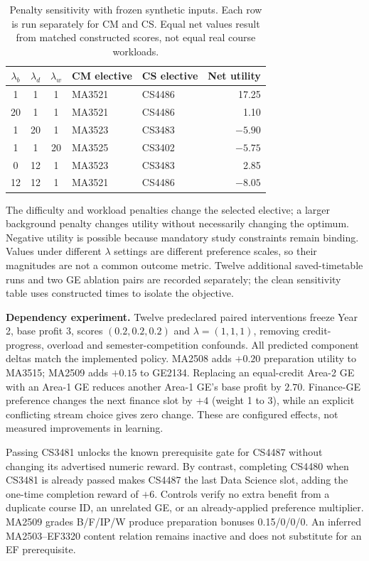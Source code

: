 \documentclass{article}
\begin{document}
\begin{table}[H]
\centering\small
\caption{Penalty sensitivity with frozen synthetic inputs. Each row is run separately for CM and CS. Equal net values result from matched constructed scores, not equal real course workloads.}
\begin{tabular}{cccp{1.05in}p{1.05in}r}
\toprule
$\lambda_b$ & $\lambda_d$ & $\lambda_w$ & CM elective & CS elective & Net utility\\
\midrule
1 & 1 & 1 & MA3521 & CS4486 & 17.25\\
20 & 1 & 1 & MA3521 & CS4486 & 1.10\\
1 & 20 & 1 & MA3523 & CS3483 & $-5.90$\\
1 & 1 & 20 & MA3525 & CS3402 & $-5.75$\\
0 & 12 & 1 & MA3523 & CS3483 & 2.85\\
12 & 12 & 1 & MA3521 & CS4486 & $-8.05$\\
\bottomrule
\end{tabular}
\label{tab:lambda}
\end{table}

The difficulty and workload penalties change the selected elective; a larger background penalty changes utility without necessarily changing the optimum. Negative utility is possible because mandatory study constraints remain binding. Values under different $\lambda$ settings are different preference scales, so their magnitudes are not a common outcome metric. Twelve additional saved-timetable runs and two GE ablation pairs are recorded separately; the clean sensitivity table uses constructed times to isolate the objective.

\textbf{Dependency experiment.} Twelve predeclared paired interventions freeze Year 2, base profit 3, scores $(0.2,0.2,0.2)$ and $\lambda=(1,1,1)$, removing credit-progress, overload and semester-competition confounds. All predicted component deltas match the implemented policy. MA2508 adds $+0.20$ preparation utility to MA3515; MA2509 adds $+0.15$ to GE2134. Replacing an equal-credit Area-2 GE with an Area-1 GE reduces another Area-1 GE's base profit by $2.70$. Finance-GE preference changes the next finance slot by $+4$ (weight 1 to 3), while an explicit conflicting stream choice gives zero change. These are configured effects, not measured improvements in learning.

Passing CS3481 unlocks the known prerequisite gate for CS4487 without changing its advertised numeric reward. By contrast, completing CS4480 when CS3481 is already passed makes CS4487 the last Data Science slot, adding the one-time completion reward of $+6$. Controls verify no extra benefit from a duplicate course ID, an unrelated GE, or an already-applied preference multiplier. MA2509 grades B/F/IP/W produce preparation bonuses 0.15/0/0/0. An inferred MA2503--EF3320 content relation remains inactive and does not substitute for an EF prerequisite.
\end{document}
